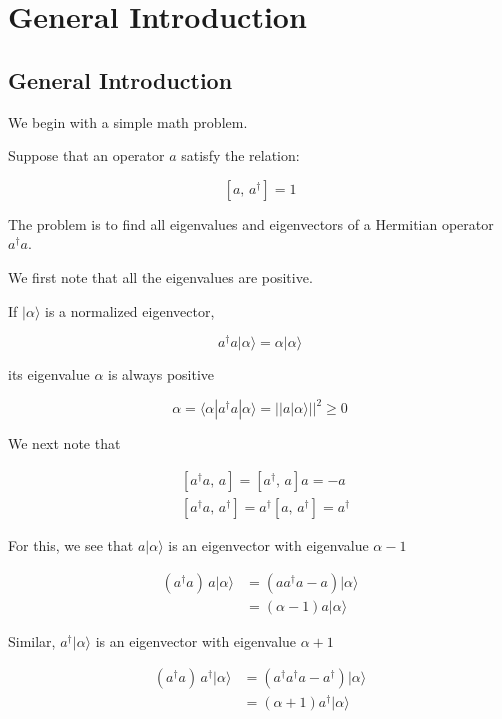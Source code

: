 \chapter{General Introduction}

\section{General Introduction}


We begin with a simple math problem.

Suppose that an operator $a$ satisfy the relation:

\[\left[a,\,a^{\dagger}\right] = 1 \]

The problem is to find all eigenvalues and eigenvectors of a Hermitian operator $a^{\dagger}a$.

We first note that all the eigenvalues are positive.

If $|\alpha\rangle$ is a normalized eigenvector,

\[a^{\dagger}a|\alpha\rangle = \alpha|\alpha\rangle \]

its eigenvalue $\alpha$ is always positive

\[\alpha = \langle\alpha| a^{\dagger}a|\alpha\rangle = ||a|\alpha\rangle||^2 \ge 0 \]

We next note that

\[\begin{split}
&\left[a^{\dagger}a,\,a\right] = \left[a^{\dagger},\, a\right]a = -a \\
&\left[a^{\dagger}a,\,a^{\dagger}\right] = a^{\dagger}\left[a,\,a^{\dagger}\right] = a^{\dagger}
\end{split} \]

For this, we see that $a|\alpha\rangle$ is an eigenvector with eigenvalue $\alpha - 1$

\[\begin{split}
(a^{\dagger}a)\,a|\alpha\rangle &= \left(aa^{\dagger}a -a\right)|\alpha\rangle \\
&=(\alpha - 1)a|\alpha\rangle
\end{split}\]

Similar, $a^{\dagger}|\alpha\rangle$ is an eigenvector with eigenvalue $\alpha + 1$

\[\begin{split}
(a^{\dagger}a)\,a^{\dagger}|\alpha\rangle &= \left(a^{\dagger}a^{\dagger}a -a^{\dagger}\right)|\alpha\rangle \\
&=(\alpha + 1)a^{\dagger}|\alpha\rangle
\end{split}\]

